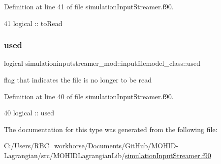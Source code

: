 Definition at line 41 of file simulation\+Input\+Streamer.\+f90.


\begin{DoxyCode}
41         \textcolor{keywordtype}{logical} :: toRead
\end{DoxyCode}
\mbox{\label{structsimulationinputstreamer__mod_1_1inputfilemodel__class_a003333db579141a5b52c141b591cc86b}} 
\subsubsection{\texorpdfstring{used}{used}}
{\footnotesize\ttfamily logical simulationinputstreamer\+\_\+mod\+::inputfilemodel\+\_\+class\+::used\hspace{0.3cm}{\ttfamily [private]}}



flag that indicates the file is no longer to be read 



Definition at line 40 of file simulation\+Input\+Streamer.\+f90.


\begin{DoxyCode}
40         \textcolor{keywordtype}{logical} :: used
\end{DoxyCode}


The documentation for this type was generated from the following file\+:\begin{DoxyCompactItemize}
\item 
C\+:/\+Users/\+R\+B\+C\+\_\+workhorse/\+Documents/\+Git\+Hub/\+M\+O\+H\+I\+D-\/\+Lagrangian/src/\+M\+O\+H\+I\+D\+Lagrangian\+Lib/\mbox{\hyperlink{simulation_input_streamer_8f90}{simulation\+Input\+Streamer.\+f90}}\end{DoxyCompactItemize}
